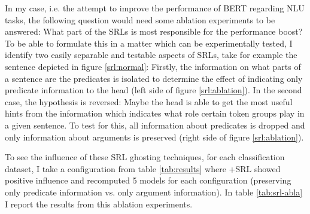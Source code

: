 {In my case, i.e. the attempt to improve the performance of BERT regarding NLU tasks, the
following question would need some ablation experiments to be answered: What part of the SRLs
is most responsible for the performance boost? To be able to formulate this in a matter which
can be experimentally tested, I identify two easily separable and testable aspects of SRLs,
take for example the sentence depicted in figure \ref{srl:normal}: Firstly, the information
on what parts of a sentence are the predicates is isolated to determine the effect of indicating only
predicate information to the head (left side of figure \ref{srl:ablation}).
In the second case, the hypothesis is reversed: Maybe the head is able to get the most useful
hints from the information which indicates what role certain token groups play in a given
sentence. To test for this, all information about predicates is dropped and only information
about arguments is preserved (right side of figure \ref{srl:ablation}).

To see the influence of these SRL ghosting techniques, for each classification dataset, I take a
configuration from table \ref{tab:results} where +SRL showed positive influence and recomputed 5
models for each configuration (preserving only predicate information vs. only argument information).
In table \ref{tab:srl-abla} I report the results from this ablation experiments.


}
